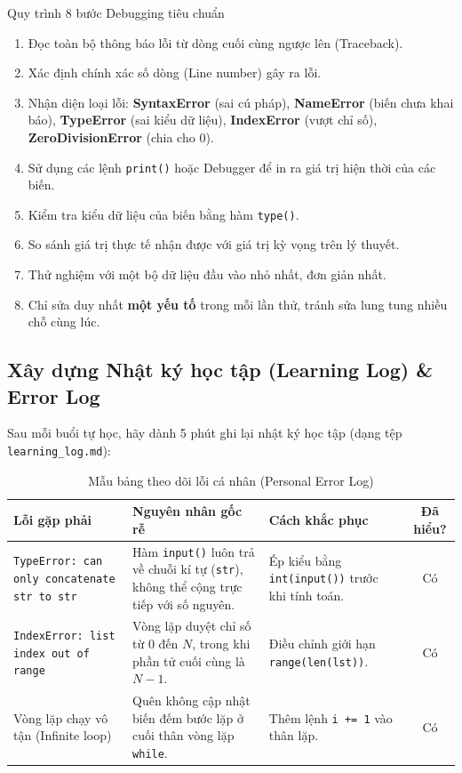 \documentclass[11pt,a4paper]{article}
\begin{document}
\begin{infobox}{Quy trình 8 bước Debugging tiêu chuẩn}
\begin{enumerate}[leftmargin=1.5em, itemsep=2pt]
    \item Đọc toàn bộ thông báo lỗi từ dòng cuối cùng ngược lên (Traceback).
    \item Xác định chính xác số dòng (Line number) gây ra lỗi.
    \item Nhận diện loại lỗi: \textbf{SyntaxError} (sai cú pháp), \textbf{NameError} (biến chưa khai báo), \textbf{TypeError} (sai kiểu dữ liệu), \textbf{IndexError} (vượt chỉ số), \textbf{ZeroDivisionError} (chia cho 0).
    \item Sử dụng các lệnh \texttt{print()} hoặc Debugger để in ra giá trị hiện thời của các biến.
    \item Kiểm tra kiểu dữ liệu của biến bằng hàm \texttt{type()}.
    \item So sánh giá trị thực tế nhận được với giá trị kỳ vọng trên lý thuyết.
    \item Thử nghiệm với một bộ dữ liệu đầu vào nhỏ nhất, đơn giản nhất.
    \item Chỉ sửa duy nhất \textbf{một yếu tố} trong mỗi lần thử, tránh sửa lung tung nhiều chỗ cùng lúc.
\end{enumerate}
\end{infobox}

\subsection{Xây dựng Nhật ký học tập (Learning Log) \& Error Log}
Sau mỗi buổi tự học, hãy dành 5 phút ghi lại nhật ký học tập (dạng tệp \texttt{learning\_log.md}):
\begin{table}[htbp]
\centering
\small
\begin{tabularx}{\textwidth}{@{}p{4.2cm} X p{3.6cm} c@{}}
\toprule
\textbf{Lỗi gặp phải} & \textbf{Nguyên nhân gốc rễ} & \textbf{Cách khắc phục} & \textbf{Đã hiểu?} \\
\midrule
\texttt{TypeError: can only concatenate str to str} & Hàm \texttt{input()} luôn trả về chuỗi kí tự (\texttt{str}), không thể cộng trực tiếp với số nguyên. & Ép kiểu bằng \texttt{int(input())} trước khi tính toán. & Có \\
\midrule
\texttt{IndexError: list index out of range} & Vòng lặp duyệt chỉ số từ 0 đến $N$, trong khi phần tử cuối cùng là $N-1$. & Điều chỉnh giới hạn \texttt{range(len(lst))}. & Có \\
\midrule
Vòng lặp chạy vô tận (Infinite loop) & Quên không cập nhật biến đếm bước lặp ở cuối thân vòng lặp \texttt{while}. & Thêm lệnh \texttt{i += 1} vào thân lặp. & Có \\
\bottomrule
\end{tabularx}
\caption{Mẫu bảng theo dõi lỗi cá nhân (Personal Error Log)}
\end{table}
\end{document}
